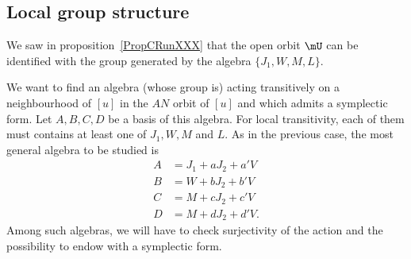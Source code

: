 \subsection{Local group structure}

We saw in proposition~\ref{PropCRunXXX} that the open orbit $\mU$ can be identified with the group generated by the algebra $\{ J_{1},W,M,L \}$.

We want to find an algebra (whose group is) acting transitively on a neighbourhood of $[u]$ in the $AN$ orbit of $[u]$ and which admits a symplectic form. Let $A,B,C,D$ be a basis of this algebra. For local transitivity, each of them must contains at least one of $J_{1},W,M$ and $L$. As in the previous case, the most general algebra to be studied is
\begin{subequations}   \label{EqAlgGEnennsy}
	\begin{align}
		A & =J_{1}+aJ_{2}+a'V \\
		B & =W+bJ_{2}+b'V     \\
		C & =M+cJ_{2}+c'V     \\
		D & =M+dJ_{2}+d'V.
	\end{align}
\end{subequations}
Among such algebras, we will have to check surjectivity of the action and the possibility to endow with a symplectic form.

